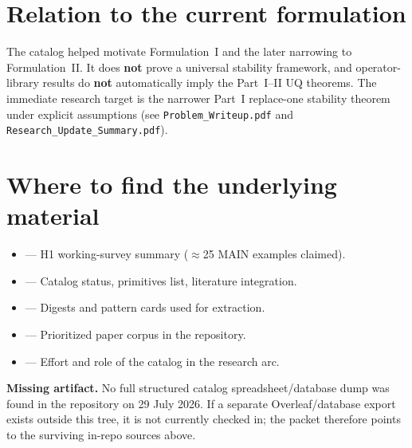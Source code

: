 \documentclass[11pt]{article}
\begin{document}
\section{Relation to the current formulation}

The catalog helped motivate Formulation~I and the later narrowing to Formulation~II.
It does \textbf{not} prove a universal stability framework, and operator-library results
do \textbf{not} automatically imply the Part~I--II UQ theorems.
The immediate research target is the narrower Part~I replace-one stability theorem under
explicit assumptions (see \texttt{Problem\_Writeup.pdf} and
\texttt{Research\_Update\_Summary.pdf}).

\section{Where to find the underlying material}

\begin{itemize}[itemsep=2pt]
  \item {} ---
        H1 working-survey summary ($\approx$25 MAIN examples claimed).
  \item {} ---
        Catalog status, primitives list, literature integration.
  \item {} ---
        Digests and pattern cards used for extraction.
  \item {} ---
        Prioritized paper corpus in the repository.
  \item {} ---
        Effort and role of the catalog in the research arc.
\end{itemize}

\vspace{4pt}
\noindent\textbf{Missing artifact.}
No full structured catalog spreadsheet/database dump was found in the repository on
29 July 2026. If a separate Overleaf/database export exists outside this tree, it is not
currently checked in; the packet therefore points to the surviving in-repo sources above.
\end{document}
